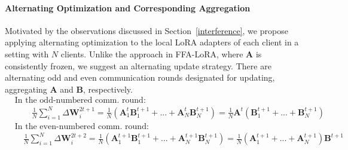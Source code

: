 \documentclass{article}
\theoremstyle{plain}
\theoremstyle{definition}
\theoremstyle{remark}
\begin{document}
\paragraph{Alternating Optimization and Corresponding Aggregation}
Motivated by the observations discussed in Section~\ref{interference}, we propose applying alternating optimization to the local LoRA adapters of each client in a setting with $N$ clients. Unlike the approach in FFA-LoRA, where $\mathbf{A}$ is consistently frozen, we suggest an alternating update strategy. There are alternating odd and even communication rounds designated for updating, aggregating $\mathbf{A}$ and $\mathbf{B}$, respectively.
\begin{align}
 &\text{In the odd-numbered comm. round:}\nonumber \\ &\qquad  \frac{1}{N} \sum_{i=1}^N  \Delta \mathbf{W}_{i}^{2t+1}= \frac{1}{N} (\mathbf{A}_1^{t}\mathbf{B}_1^{t+1}+...+ \mathbf{A}_N^{t}\mathbf{B}_N^{t+1}) 
  = \frac{1}{N} \mathbf{A}^t(\mathbf{B}_1^{t+1}+...+ \mathbf{B}_N^{t+1}) \label{roundt} \\
  & \text{In the even-numbered comm. round:} \nonumber\\&\quad  \frac{1}{N} \sum_{i=1}^N  \Delta \mathbf{W}_{i}^{2t+2} = \frac{1}{N} (\mathbf{A}_1^{t+1}\mathbf{B}_1^{t+1}+...+ \mathbf{A}_N^{t+1}\mathbf{B}_N^{t+1}) 
= \frac{1}{N} (\mathbf{A}_1^{t+1}+...+ \mathbf{A}_N^{t+1})\mathbf{B}^{t+1} \label{roundt1}
\end{align}
\end{document}
